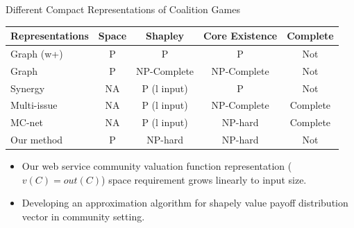 \documentclass{beamer}
\begin{document}
\begin{frame}{Different Compact Representations of Coalition Games}

    \begin{table}
        \small
        \begin{tabular}{l|c|c|c|c}
        Representations                  & Space    & Shapley                  & Core Existence  & Complete     \\ \hline
        Graph (w+)                       & P        & P                        & P               & Not          \\
        Graph                            & P        & NP-Complete              & NP-Complete     & Not          \\
        Synergy                          & NA       & P (l input)              & P               & Not          \\
        Multi-issue                      & NA       & P (l input)              & NP-Complete     & Complete     \\
        MC-net                           & NA       & P (l input)              & NP-hard         & Complete     \\
        Our method                       & P        & NP-hard                  & NP-hard         & Not          \\
        \end{tabular}
    \end{table}

    \begin{itemize}
        \item Our web service community valuation function representation ($v(C) = out(C)$) space requirement grows linearly to input size.
        \item Developing an approximation algorithm for shapely value payoff distribution vector in community setting.
    \end{itemize}

\end{frame}


\end{document}
